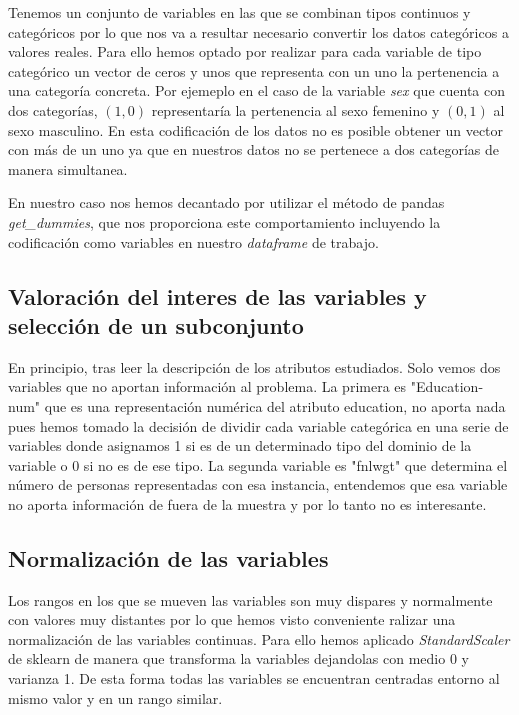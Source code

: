 \documentclass[a4paper,11pt]{article}
\begin{document}
Tenemos un conjunto de variables en las que se combinan tipos continuos y
categóricos por lo que nos va a resultar necesario convertir los datos
categóricos a valores reales. Para ello hemos optado por realizar para cada
variable de tipo categórico un vector de ceros y unos que representa con un uno
la pertenencia a una categoría concreta. Por ejemeplo en el caso de la variable
\textit{sex} que cuenta con dos categorías, $(1,0)$ representaría la pertenencia
al sexo femenino y $(0,1)$ al sexo masculino. En esta codificación de los datos
no es posible obtener un vector con más de un uno ya que en nuestros datos no se
pertenece a dos categorías de manera simultanea.

En nuestro caso nos hemos decantado por utilizar el método de pandas
\textit{get\_dummies}, que nos proporciona este comportamiento incluyendo la
codificación como variables en nuestro \textit{dataframe} de trabajo.

\subsection{Valoración del interes de las variables y selección de un subconjunto}

En principio, tras leer la descripción de los atributos estudiados. Solo vemos
dos variables que no aportan información al problema. La primera es
"Education-num" que es una representación numérica del atributo education, no
aporta nada pues hemos tomado la decisión de dividir cada variable categórica en
una serie de variables donde asignamos 1 si es de un determinado tipo del
dominio de la variable o 0 si no es de ese tipo. La segunda variable es "fnlwgt"
que determina el número de personas representadas con esa instancia, entendemos
que esa variable no aporta información de fuera de la muestra y por lo tanto no
es interesante.

\subsection{Normalización de las variables}

Los rangos en los que se mueven las variables son muy dispares y normalmente con
valores muy distantes por lo que hemos visto conveniente ralizar una
normalización de las variables continuas. Para ello hemos aplicado
\textit{StandardScaler} de sklearn de manera que transforma la variables
dejandolas con medio 0 y varianza 1. De esta forma  todas las variables se
encuentran centradas entorno al mismo valor y en un rango similar. 
\end{document}
